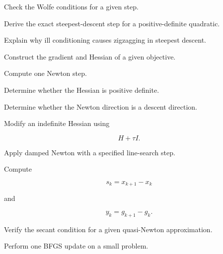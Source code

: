 \begin{exercise}[3]
Check the Wolfe conditions for a given step.
\end{exercise}

\begin{exercise}[3]
Derive the exact steepest-descent step for a positive-definite quadratic.
\end{exercise}

\begin{exercise}[3]
Explain why ill conditioning causes zigzagging in steepest descent.
\end{exercise}

\begin{exercise}[2]
Construct the gradient and Hessian of a given objective.
\end{exercise}

\begin{exercise}[3]
Compute one Newton step.
\end{exercise}

\begin{exercise}[3]
Determine whether the Hessian is positive definite.
\end{exercise}

\begin{exercise}[3]
Determine whether the Newton direction is a descent direction.
\end{exercise}

\begin{exercise}[3]
Modify an indefinite Hessian using

\[
H+\tau I.
\]
\end{exercise}

\begin{exercise}[3]
Apply damped Newton with a specified line-search step.
\end{exercise}

\begin{exercise}[3]
Compute

\[
s_k=x_{k+1}-x_k
\]

and

\[
y_k=g_{k+1}-g_k.
\]
\end{exercise}

\begin{exercise}[3]
Verify the secant condition for a given quasi-Newton approximation.
\end{exercise}

\begin{exercise}[3]
Perform one BFGS update on a small problem.
\end{exercise}

